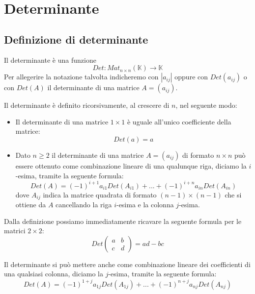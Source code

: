 
\section{Determinante}
\subsection{Definizione di determinante}
Il determinante \`e una funzione
\begin{equation*}
	Det : Mat_{n \times n}(\mathbb{K}) \to \mathbb{K}
\end{equation*}
Per allegerire la notazione talvolta indicheremo con $|a_{ij}|$ oppure con
$Det(a_{ij})$ o con $Det(A)$ il determinante di una matrice $A = (a_{ij})$.

Il determinante \`e definito ricorsivamente, al crescere di $n$, nel seguente
modo:
\begin{itemize}
	\item Il determinante di una matrice $1 \times 1$ \`e uguale all'unico
	      coefficiente della matrice:
	      \begin{equation*}
		      Det(a) = a
	      \end{equation*}
	\item Dato $n \geq 2$ il determinante di una matrice $A = (a_{ij})$ di
	      formato $n \times n$ pu\`o essere ottenuto come combinazione lineare
	      di una qualunque riga, diciamo la $i$-esima, tramite la seguente
	      formula:
	      \begin{equation*}
		      Det(A) = (-1)^{i + 1}a_{i1}Det(A_{i1}) + ... + 
		      (-1)^{i + n}a_{in}Det(A_{in})
	      \end{equation*}
	      dove $A_{ij}$ indica la matrice quadrata di formato
	      $(n - 1) \times (n - 1)$ che si ottiene da $A$ cancellando la riga
	      $i$-esima e la colonna $j$-esima.
\end{itemize}

\begin{observation}
	Dalla definizione possiamo immediatamente ricavare la seguente formula
	per le matrici $2 \times 2$:
	\begin{equation*}
		Det \begin{pmatrix}
			a & b \\
			c & d
		\end{pmatrix} =
		ad - bc
	\end{equation*}
\end{observation}

\begin{observation}
	Il determinante si pu\`o mettere anche come combinazione lineare dei
	coefficienti di una qualsiasi colonna, diciamo la $j$-esima, tramite
	la seguente formula:
	\begin{equation*}
		Det(A) = (-1)^{1 + j}a_{1j}Det(A_{1j}) + ... +
		(-1)^{n + j}a_{nj}Det(A_{nj})
	\end{equation*}
\end{observation}

